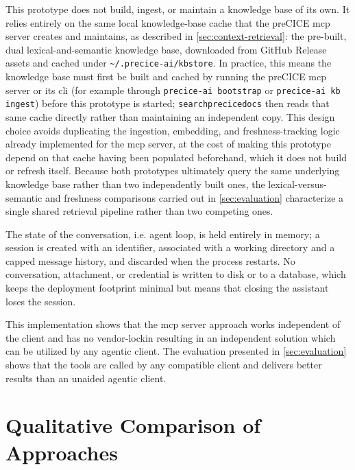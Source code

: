 \documentclass[
  numbers=noenddot,
  english,
  a4paper,
  twoside,
  bibliography=totoc,
  headsepline,
  cleardoublepage=empty,
  parskip=half,
  draft=false
]{scrbook}
\theoremstyle{break}
\renewcommand{\_}{\textunderscore\allowbreak}
\begin{document}
This prototype does not build, ingest, or maintain a knowledge base of its own.
It relies entirely on the same local knowledge-base cache that the preCICE \gls{mcp} server
creates and maintains, as described in \cref{sec:context-retrieval}: the pre-built, dual
lexical-and-semantic knowledge base, downloaded from GitHub Release assets and cached under
\texttt{\textasciitilde/.precice-ai/kb\_store}.
In practice, this means the knowledge base must first be built and cached by running the
preCICE \gls{mcp} server or its \gls{cli} (for example through \texttt{precice-ai bootstrap} or
\texttt{precice-ai kb ingest}) before this prototype is started; \texttt{search\_precice\_docs}
then reads that same cache directly rather than maintaining an independent copy.
This design choice avoids duplicating the ingestion, embedding, and freshness-tracking logic
already implemented for the \gls{mcp} server, at the cost of making this prototype depend on
that cache having been populated beforehand, which it does not build or refresh itself.
Because both prototypes ultimately query the same underlying knowledge base rather than two
independently built ones, the lexical-versus-semantic and freshness comparisons carried out in
\cref{sec:evaluation} characterize a single shared retrieval pipeline rather than two competing
ones.

The state of the conversation, i.e. agent loop, is held entirely in memory; a session is created with an identifier, associated with a
working directory and a capped message history, and discarded when the process restarts.
No conversation, attachment, or credential is written to disk or to a database, which keeps the
deployment footprint minimal but means that closing the assistant loses the session.

This implementation shows that the \gls{mcp} server approach works independent of the client 
and has no vendor-lockin resulting in an independent solution which can be utilized by any 
agentic client. The evaluation presented in \cref{sec:evaluation} shows that the tools are called 
by any compatible client and delivers better results than an unaided agentic client.


\section{Qualitative Comparison of Approaches}\label{sec:claudecode-approach:comparison}
\end{document}
